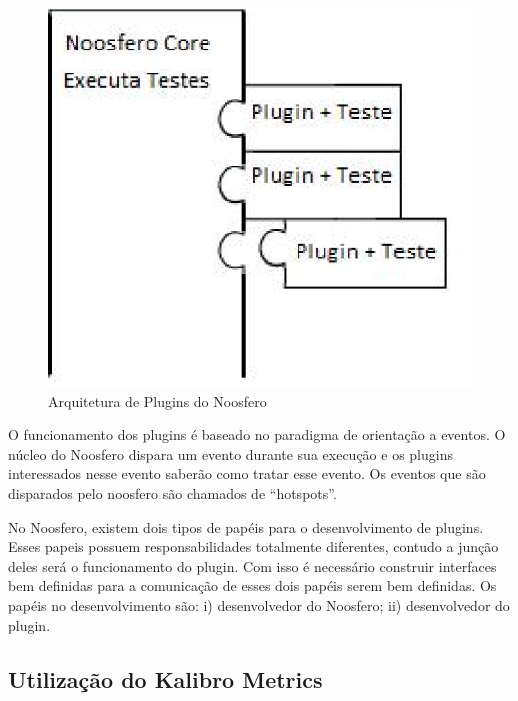 \graphicspath{{figuras/}}
\begin{figure}[H]
\centering
\includegraphics{plugins}
\caption{Arquitetura de Plugins do Noosfero}
\label{Rotulo}
\end{figure}

O funcionamento dos plugins é baseado no paradigma de orientação a eventos. O núcleo do Noosfero dispara um evento durante sua execução e os plugins interessados nesse evento saberão como tratar esse evento. Os eventos que são disparados pelo noosfero são chamados de “hotspots”. 

No Noosfero, existem dois tipos de papéis para o desenvolvimento de plugins. Esses
papeis possuem responsabilidades totalmente diferentes, contudo a junção deles será o
funcionamento do plugin. Com isso é necessário construir interfaces bem definidas para a
comunicação de esses dois papéis serem bem definidas. Os papéis no desenvolvimento são: i) desenvolvedor do Noosfero; ii) desenvolvedor do plugin.

\subsection{Utilização do Kalibro Metrics}

